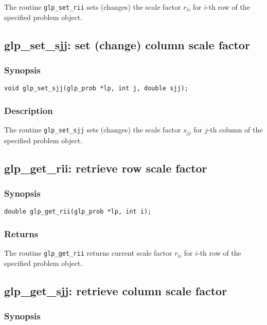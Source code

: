 The routine \verb|glp_set_rii| sets (changes) the scale factor $r_{ii}$
for $i$-th row of the specified problem object.

\subsection{glp\_set\_sjj: set (change) column scale factor}

\subsubsection*{Synopsis}

\begin{verbatim}
void glp_set_sjj(glp_prob *lp, int j, double sjj);
\end{verbatim}

\subsubsection*{Description}

The routine \verb|glp_set_sjj| sets (changes) the scale factor $s_{jj}$
for $j$-th column of the specified problem object.

\subsection{glp\_get\_rii: retrieve row scale factor}

\subsubsection*{Synopsis}

\begin{verbatim}
double glp_get_rii(glp_prob *lp, int i);
\end{verbatim}

\subsubsection*{Returns}

The routine \verb|glp_get_rii| returns current scale factor $r_{ii}$ for
$i$-th row of the specified problem object.

\subsection{glp\_get\_sjj: retrieve column scale factor}

\subsubsection*{Synopsis}

